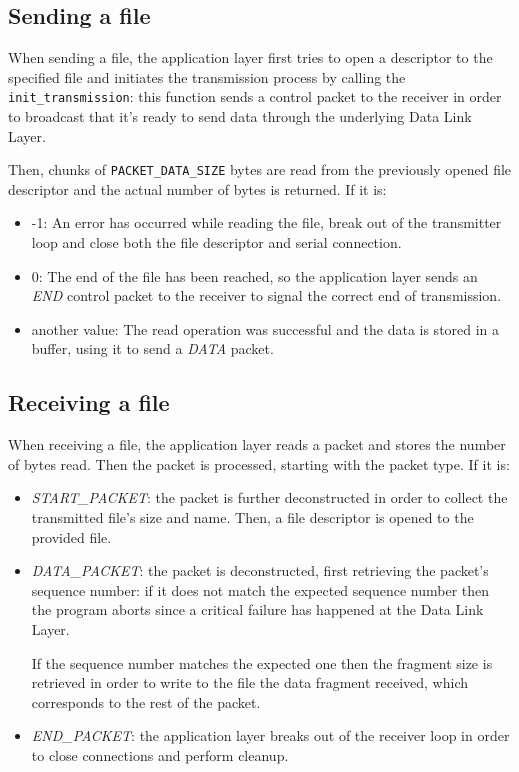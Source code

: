 \documentclass[11pt,a4paper,twocolumn]{article}
\begin{document}
\subsection{Sending a file}

When sending a file, the application layer first tries to open a descriptor to the specified file and initiates the transmission process by calling the \lstinline{init_transmission}: this function sends a control packet to the receiver in order to broadcast that it's ready to send data through the underlying Data Link Layer.

Then, chunks of \lstinline{PACKET_DATA_SIZE} bytes are read from the previously opened file descriptor and the actual number of bytes is returned. If it is:
\begin{itemize}
    \item -1: An error has occurred while reading the file, break out of the transmitter loop and close both the file descriptor and serial connection.
    
    \item 0: The end of the file has been reached, so the application layer sends an \textit{END} control packet to the receiver to signal the correct end of transmission.

    \item another value: The read operation was successful and the data is stored in a buffer, using it to send a \textit{DATA} packet.
\end{itemize}

\subsection{Receiving a file}

When receiving a file, the application layer reads a packet and stores the number of bytes read. Then the packet is processed, starting with the packet type. If it is:
\begin{itemize}
    \item \textit{START\_PACKET}: the packet is further deconstructed in order to collect the transmitted file's size and name. Then, a file descriptor is opened to the provided file.
    
    \item \textit{DATA\_PACKET}: the packet is deconstructed, first retrieving the packet's sequence number: if it does not match the expected sequence number then the program aborts since a critical failure has happened at the Data Link Layer. 
    
    If the sequence number matches the expected one then the fragment size is retrieved in order to write to the file the data fragment received, which corresponds to the rest of the packet.
    
    \item \textit{END\_PACKET}: the application layer breaks out of the receiver loop in order to close connections and perform cleanup.
\end{itemize}
\end{document}
